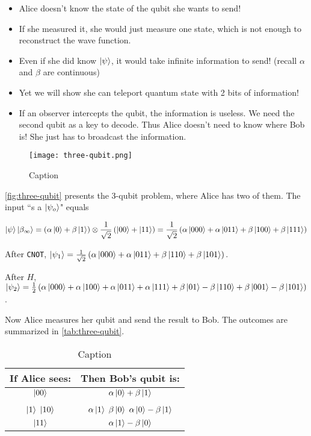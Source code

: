 \documentclass[12pt, english]{book}
\begin{document}
\begin{itemize}
	\item Alice doesn't know the state of the qubit she wants to send!
	
	\item If she measured it, she would just measure one state, which is not enough to reconstruct the wave function.
	
	\item Even if she did know $\ket{\psi}$, it would take infinite information to send! 
	(recall $\alpha$ and $\beta$ are continuous)
	
	\item Yet we will show she can teleport quantum state with 2 bits of information!
	
	\item If an observer intercepts the qubit, the information is useless.
	We need the second qubit as a key to decode.
	Thus Alice doesn't need to know where Bob is! 
	She just has to broadcast the information.
\end{itemize}

\begin{figure}[!ht]
	\centering
	\texttt{[image: three-qubit.png]}
	\caption{Caption}
	\label{fig:three-qubit}
\end{figure}

\autoref{fig:three-qubit} presents the 3-qubit problem, where Alice has two of them.
The input ``s a $\ket{\psi_o}$" equals

\[ \ket{\psi} \ket{\beta_{\infty}} = \left( \alpha \ket{0} + \beta \ket{1} \right) \otimes \frac{1}{\sqrt{2}} \left( \ket{00} + \ket{11} \right) = \frac{1}{\sqrt{2}} \left( \alpha \ket{000} + \alpha \ket{011} + \beta \ket{100} + \beta \ket{111} \right) \]

After \texttt{CNOT}, $\ket{\psi_1} = \frac{1}{\sqrt{2}} \left( \alpha \ket{000} + \alpha \ket{011} + \beta \ket{110} + \beta \ket{101} \right)$.

After $H$, $\ket{\psi_2} = \frac{1}{2} \left( \alpha \ket{000} + \alpha \ket{100} + \alpha \ket{011} + \alpha \ket{111} + \beta \ket{01} - \beta \ket{110} + \beta \ket{001} - \beta \ket{101} \right)$.

Now Alice measures her qubit and send the result to Bob.
The outcomes are summarized in \autoref{tab:three-qubit}.

\begin{table}[!ht]
	\centering
	\begin{tabular}{cc}
		If Alice sees: & Then Bob's qubit is: \\
		\toprule 
		$\ket{00}$ & $\alpha \ket{0} + \beta \ket{1}$ \\
		$\ket{1}$ $\ket{10}$ & $\alpha \ket{1}$ $\beta \ket{0}$ $\alpha \ket{0} - \beta \ket{1}$ \\
		$\ket{11}$ & $\alpha \ket{1} - \beta \ket{0}$
	\end{tabular}
	\caption{Caption}
	\label{tab:three-qubit}
\end{table}
\end{document}
